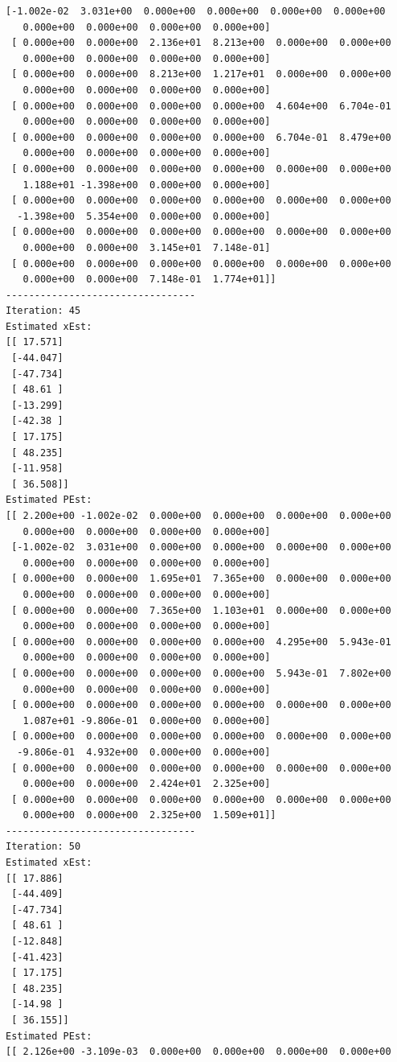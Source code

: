 \documentclass[11pt]{article}
\begin{document}
\begin{Verbatim}[commandchars=\\\{\}]
 [-1.002e-02  3.031e+00  0.000e+00  0.000e+00  0.000e+00  0.000e+00
   0.000e+00  0.000e+00  0.000e+00  0.000e+00]
 [ 0.000e+00  0.000e+00  2.136e+01  8.213e+00  0.000e+00  0.000e+00
   0.000e+00  0.000e+00  0.000e+00  0.000e+00]
 [ 0.000e+00  0.000e+00  8.213e+00  1.217e+01  0.000e+00  0.000e+00
   0.000e+00  0.000e+00  0.000e+00  0.000e+00]
 [ 0.000e+00  0.000e+00  0.000e+00  0.000e+00  4.604e+00  6.704e-01
   0.000e+00  0.000e+00  0.000e+00  0.000e+00]
 [ 0.000e+00  0.000e+00  0.000e+00  0.000e+00  6.704e-01  8.479e+00
   0.000e+00  0.000e+00  0.000e+00  0.000e+00]
 [ 0.000e+00  0.000e+00  0.000e+00  0.000e+00  0.000e+00  0.000e+00
   1.188e+01 -1.398e+00  0.000e+00  0.000e+00]
 [ 0.000e+00  0.000e+00  0.000e+00  0.000e+00  0.000e+00  0.000e+00
  -1.398e+00  5.354e+00  0.000e+00  0.000e+00]
 [ 0.000e+00  0.000e+00  0.000e+00  0.000e+00  0.000e+00  0.000e+00
   0.000e+00  0.000e+00  3.145e+01  7.148e-01]
 [ 0.000e+00  0.000e+00  0.000e+00  0.000e+00  0.000e+00  0.000e+00
   0.000e+00  0.000e+00  7.148e-01  1.774e+01]]
---------------------------------
Iteration: 45
Estimated xEst:
[[ 17.571]
 [-44.047]
 [-47.734]
 [ 48.61 ]
 [-13.299]
 [-42.38 ]
 [ 17.175]
 [ 48.235]
 [-11.958]
 [ 36.508]]
Estimated PEst:
[[ 2.200e+00 -1.002e-02  0.000e+00  0.000e+00  0.000e+00  0.000e+00
   0.000e+00  0.000e+00  0.000e+00  0.000e+00]
 [-1.002e-02  3.031e+00  0.000e+00  0.000e+00  0.000e+00  0.000e+00
   0.000e+00  0.000e+00  0.000e+00  0.000e+00]
 [ 0.000e+00  0.000e+00  1.695e+01  7.365e+00  0.000e+00  0.000e+00
   0.000e+00  0.000e+00  0.000e+00  0.000e+00]
 [ 0.000e+00  0.000e+00  7.365e+00  1.103e+01  0.000e+00  0.000e+00
   0.000e+00  0.000e+00  0.000e+00  0.000e+00]
 [ 0.000e+00  0.000e+00  0.000e+00  0.000e+00  4.295e+00  5.943e-01
   0.000e+00  0.000e+00  0.000e+00  0.000e+00]
 [ 0.000e+00  0.000e+00  0.000e+00  0.000e+00  5.943e-01  7.802e+00
   0.000e+00  0.000e+00  0.000e+00  0.000e+00]
 [ 0.000e+00  0.000e+00  0.000e+00  0.000e+00  0.000e+00  0.000e+00
   1.087e+01 -9.806e-01  0.000e+00  0.000e+00]
 [ 0.000e+00  0.000e+00  0.000e+00  0.000e+00  0.000e+00  0.000e+00
  -9.806e-01  4.932e+00  0.000e+00  0.000e+00]
 [ 0.000e+00  0.000e+00  0.000e+00  0.000e+00  0.000e+00  0.000e+00
   0.000e+00  0.000e+00  2.424e+01  2.325e+00]
 [ 0.000e+00  0.000e+00  0.000e+00  0.000e+00  0.000e+00  0.000e+00
   0.000e+00  0.000e+00  2.325e+00  1.509e+01]]
---------------------------------
Iteration: 50
Estimated xEst:
[[ 17.886]
 [-44.409]
 [-47.734]
 [ 48.61 ]
 [-12.848]
 [-41.423]
 [ 17.175]
 [ 48.235]
 [-14.98 ]
 [ 36.155]]
Estimated PEst:
[[ 2.126e+00 -3.109e-03  0.000e+00  0.000e+00  0.000e+00  0.000e+00

\end{Verbatim}
\end{document}
